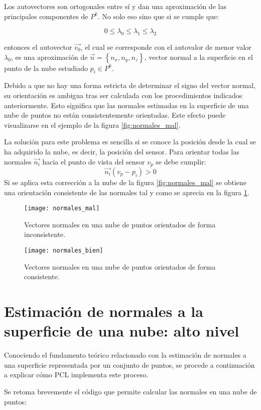 Los autovectores son ortogonales entre sí y dan una aproximación de las principales componentes de $P^k$. No solo eso sino que si se cumple que:
 
 $$0\leq\lambda_0\leq\lambda_1\leq\lambda_2$$

entonces el autovector $\vec{v_0}$, el cual se corresponde con el autovalor de menor valor $\lambda_0$, es una aproximación de $\vec{n}= \left\lbrace n_x,n_y,n_z\right\rbrace$, vector normal a la superficie en el punto de la nube estudiado $p_i \in P^k$.


Debido a que no hay una forma estricta de determinar el signo del vector normal, su orientación es ambigua tras ser calculada con los procedimientos indicados anteriormente. Esto significa que las normales estimadas en la superficie de una nube de puntos no están consistentemente orientadas. Este efecto puede visualizarse en el ejemplo de la figura \ref{fig:normales_mal}.

La solución para este problema es sencilla si se conoce la posición desde la cual se ha adquirido la nube, es decir, la posición del sensor. Para orientar todas las normales $\vec{n_i}$ hacia el punto de vista del sensor $v_p$ se debe cumplir:
$$\vec{n_i}(v_p-p_i)>0$$
Si se aplica esta corrección a la nube de la figura \ref{fig:normales_mal} se obtiene una orientación consistente de las normales tal y como se aprecia en la figura \ref{fig:normales_bien}.

\begin{figure}[!htb]
  \texttt{[image: normales\_mal]}
  \caption{Vectores normales en una nube de puntos orientados de forma inconsistente.}\label{fig:normales_mal}
\endminipage\hfill
{}
  \texttt{[image: normales\_bien]}
  \caption{Vectores normales en una nube de puntos orientados de forma consistente.}\label{fig:normales_bien}
\endminipage\hfill
\end{figure}


\section{Estimación de normales a la superficie de una nube: alto nivel}
Conociendo el fundamento teórico relacionado con la estimación de normales a una superficie representada por un conjunto de puntos, se procede a continuación a explicar cómo PCL implementa este proceso.

Se retoma brevemente el código que permite calcular las normales en una nube de puntos:

